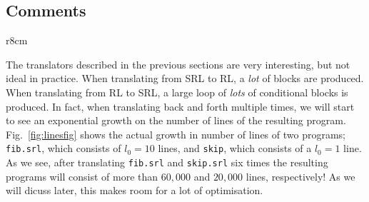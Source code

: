 \pgfplotsset{compat = 1.3}
\subsection{Comments}
\begin{wrapfigure}[19]{r}{8cm}
\caption{Program size after translation. }\label{fig:linesfig}%
\end{wrapfigure}
The translators described in the previous sections are very interesting, but not ideal in practice. When translating from SRL to RL, a \textit{lot} of blocks are produced. When translating from RL to SRL, a large loop of \textit{lots} of conditional blocks is produced. In fact, when translating back and forth multiple times, we will start to see an exponential growth on the number of lines of the resulting program. Fig.~\ref{fig:linesfig} shows the actual growth in number of lines of two programs; \texttt{fib.srl}, which consists of $l_0=10$ lines, and \texttt{skip}, which consists of a $l_0=1$ line. As we see, after translating \texttt{fib.srl} and \texttt{skip.srl} six times the resulting programs will consist of more than $60,000$ and $20,000$ lines, respectively! As we will dicuss later, this makes room for a lot of optimisation.
